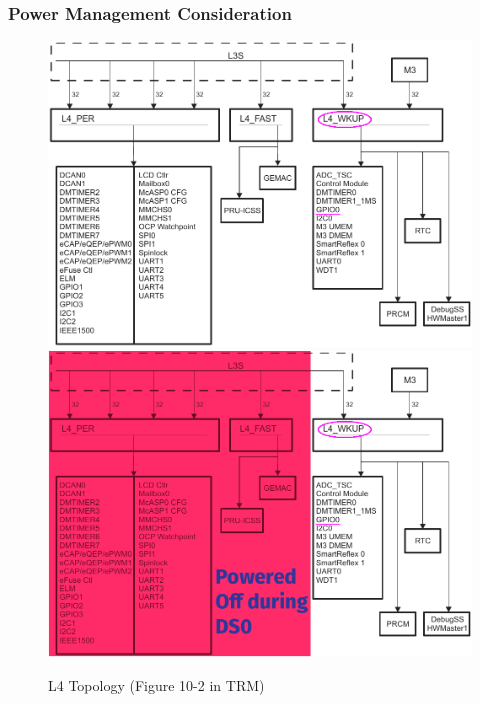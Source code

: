 \begin{frame}
  \frametitle{Power Management Consideration}
  \begin{overlayarea}{\textwidth}{\textheight}
    \begin{figure}
      \centering
      {%
      \includegraphics[scale=0.3]{images/l4-gpio0-wkup.png}
      }%
      {%
      \includegraphics[scale=0.3]{images/l4-gpio0-wkup-ds0.png}
      }%
      \caption{L4 Topology (Figure 10-2 in TRM)}
    \end{figure}
  \end{overlayarea}
  \vspace*{-10mm}
\end{frame}

